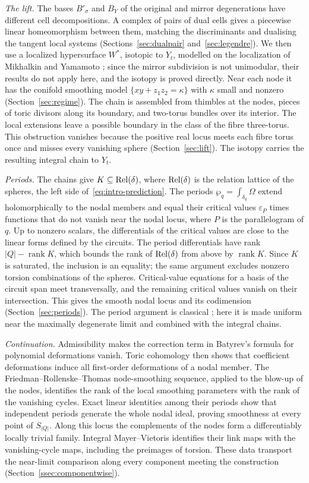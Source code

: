 \emph{The lift.} The bases $B'_\sigma$ and $B_Y$ of the original and mirror degenerations have different cell
decompositions. A complex of pairs of dual cells gives a piecewise linear homeomorphism between them, matching the
discriminants and dualising the tangent local systems (Sections~\ref{sec:dualpair} and~\ref{sec:legendre}). We then
use a localized hypersurface $W^*$, isotopic to $Y_t$, modelled on the localization of Mikhalkin and Yamamoto
\cite{Mikhalkin,Ya16}; since the mirror subdivision is not unimodular, their results do not apply here, and the isotopy
is proved directly.
Near each node it has the conifold smoothing model $\{xy+z_1z_2=\kappa\}$ with $\kappa$ small and nonzero
(Section~\ref{sec:regime}). The chain is assembled from thimbles at the nodes, pieces of toric divisors along its
boundary, and two-torus bundles over its interior. The local extensions leave a possible boundary in the class of the
fibre three-torus. This obstruction vanishes because the positive real locus meets each fibre torus once and misses
every vanishing sphere (Section~\ref{sec:lift}). The isotopy carries the resulting integral chain to $Y_t$.

\emph{Periods.} The chains give $K\subseteq\operatorname{Rel}(\delta)$, where $\operatorname{Rel}(\delta)$ is the relation lattice of the spheres, the left
side of~\eqref{eq:intro-prediction}. The periods
$\wp_q=\int_{\delta_q}\Omega$ extend holomorphically to the nodal members and equal their critical values
$\varepsilon_P$ times functions that do not vanish near the nodal locus, where $P$ is the parallelogram of $q$. Up to nonzero scalars, the
differentials of the critical values are close to the linear forms defined by the circuits. The period differentials have rank
$|Q|-\operatorname{rank}K$, which bounds the rank of $\operatorname{Rel}(\delta)$ from above by $\operatorname{rank}K$.
Since $K$ is saturated, the inclusion is an equality; the same argument excludes nonzero torsion combinations of
the spheres. Critical-value equations for a basis of the circuit span meet transversally, and the remaining
critical values vanish on their intersection. This gives the smooth nodal locus and its codimension
(Section~\ref{sec:periods}). The period argument is classical \cite{GMS95,LLW18}; here it is made uniform near the
maximally degenerate limit and combined with the integral chains.

\emph{Continuation.} Admissibility makes the correction term in Batyrev's formula for polynomial deformations
vanish. Toric cohomology then shows that coefficient deformations induce all first-order deformations of a nodal
member. The Friedman--Rollenske--Thomas node-smoothing sequence, applied to the blow-up of the nodes, identifies
the rank of the local smoothing parameters with the rank of the vanishing cycles. Exact linear identities among
their periods show that independent periods generate the whole nodal ideal, proving smoothness at every point
of $S_{|Q|}$. Along this locus the complements of the nodes form a differentiably locally trivial family.
Integral Mayer--Vietoris identifies their link maps with the vanishing-cycle maps, including the preimages of
torsion. These data transport the near-limit comparison along every component meeting the construction
(Section~\ref{ssec:componentwise}).

